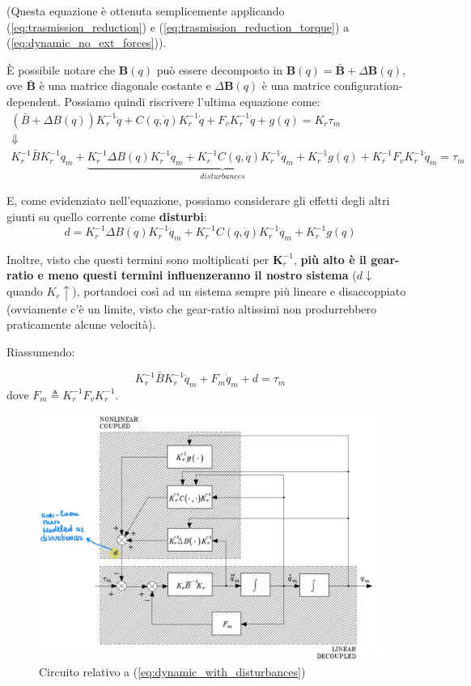 (Questa equazione è ottenuta semplicemente applicando (\ref{eq:trasmission_reduction}) e (\ref{eq:trasmission_reduction_torque}) a (\ref{eq:dynamic_no_ext_forces})).

È possibile notare che $\mathbf{B}(q)$ può essere decomposto in $\mathbf{B}(q) = \bar{\mathbf{B}} + \Delta\mathbf{B}(q)$, ove $\bar{\mathbf{B}}$ è una matrice diagonale costante e $\Delta\mathbf{B}(q)$ è una matrice configuration-dependent. Possiamo quindi riscrivere l'ultima equazione come:
\boldmath
\begin{gather*}
(\bar{B} + \Delta B(q)) K_r^{-1} \ddot{q} + C(q, \dot{q})K_r^{-1}\dot{q} + F_vK_r^{-1}\dot{q} + g(q) = K_r \tau_m \\
\Downarrow \\
K_r^{-1}\bar{B}K_r^{-1}\ddot{q}_m + 
\underbrace{K_r^{-1}\Delta B(q)K_r^{-1}\ddot{q}_m + K_r^{-1}C(q, \dot{q})K_r^{-1}\dot{q}_m + K_r^{-1}g(q)}_{disturbances}
+ K_r^{-1}F_vK_r^{-1}\dot{q}_m  = \tau_m
\end{gather*}


E, come evidenziato nell'equazione, possiamo considerare gli effetti degli altri giunti su quello corrente come \textbf{disturbi}:
\begin{equation}\label{eq:dynamic_disturbances}
	d = K_r^{-1}\Delta B(q)K_r^{-1}\ddot{q}_m + K_r^{-1}C(q, \dot{q})K_r^{-1}\dot{q}_m + K_r^{-1}g(q)
\end{equation}

Inoltre, visto che questi termini sono moltiplicati per $\mathbf{K}_r^{-1}$, \textbf{più alto è il gear-ratio e meno questi termini influenzeranno il nostro sistema} ($d \downarrow$ quando $K_r \uparrow$), portandoci così ad un sistema sempre più lineare e disaccoppiato (ovviamente c'è un limite, visto che gear-ratio altissimi non produrrebbero praticamente alcune velocità).

Riassumendo:


\begin{equation}\label{eq:dynamic_with_disturbances}
K_r^{-1}\bar{B}K_r^{-1}\ddot{q}_m + F_m\dot{q}_m + d = \tau_m
\end{equation}
dove $F_m \triangleq K_r^{-1}F_vK_r^{-1}$. 
\unboldmath



\begin{figure}[t]
	\centering
	\includegraphics[width=0.7\linewidth]{images/decentralized_joint_space_control_2}
	\caption{Circuito relativo a (\ref{eq:dynamic_with_disturbances})}
	\label{fig:decentralizedjointspacecontrol2}
\end{figure}

